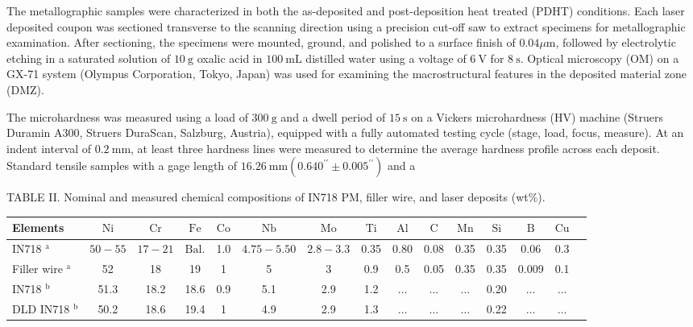 \documentclass[10pt]{article}
\begin{document}
The metallographic samples were characterized in both the as-deposited and post-deposition heat treated (PDHT) conditions. Each laser deposited coupon was sectioned transverse to the scanning direction using a precision cut-off saw to extract specimens for metallographic examination. After sectioning, the specimens were mounted, ground, and polished to a surface finish of $0.04 \mu \mathrm{m}$, followed by electrolytic etching in a saturated solution of $10 \mathrm{~g}$ oxalic acid in $100 \mathrm{~mL}$ distilled water using a voltage of $6 \mathrm{~V}$ for $8 \mathrm{~s}$. Optical microscopy (OM) on a GX-71 system (Olympus Corporation, Tokyo, Japan) was used for examining the macrostructural features in the deposited material zone (DMZ).

The microhardness was measured using a load of $300 \mathrm{~g}$ and a dwell period of $15 \mathrm{~s}$ on a Vickers microhardness (HV) machine (Struers Duramin A300, Struers DuraScan, Salzburg, Austria), equipped with a fully automated testing cycle (stage, load, focus, measure). At an indent interval of $0.2 \mathrm{~mm}$, at least three hardness lines were measured to determine the average hardness profile across each deposit. Standard tensile samples with a gage length of $16.26 \mathrm{~mm}\left(0.640^{\prime \prime} \pm 0.005^{\prime \prime}\right)$ and a

TABLE II. Nominal and measured chemical compositions of IN718 PM, filler wire, and laser deposits (wt\%).

\begin{center}
\begin{tabular}{lcccccccccccccc}
\hline\hline
Elements & $\mathrm{Ni}$ & $\mathrm{Cr}$ & $\mathrm{Fe}$ & $\mathrm{Co}$ & $\mathrm{Nb}$ & $\mathrm{Mo}$ & $\mathrm{Ti}$ & $\mathrm{Al}$ & $\mathrm{C}$ & $\mathrm{Mn}$ & $\mathrm{Si}$ & $\mathrm{B}$ & $\mathrm{Cu}$ \\
\hline
IN718 $^{\mathrm{a}}$ & $50-55$ & $17-21$ & $\mathrm{Bal}$. & 1.0 & $4.75-5.50$ & $2.8-3.3$ & 0.35 & 0.80 & 0.08 & 0.35 & 0.35 & 0.06 & 0.3 \\
Filler wire $^{\mathrm{a}}$ & 52 & 18 & 19 & 1 & 5 & 3 & 0.9 & 0.5 & 0.05 & 0.35 & 0.35 & 0.009 & 0.1 \\
IN718 $^{\mathrm{b}}$ & 51.3 & 18.2 & 18.6 & 0.9 & 5.1 & 2.9 & 1.2 & $\ldots$ & $\ldots$ & $\ldots$ & 0.20 & $\ldots$ & $\ldots$ \\
DLD IN718 $^{\mathrm{b}}$ & 50.2 & 18.6 & 19.4 & 1 & 4.9 & 2.9 & 1.3 & $\ldots$ & $\ldots$ & $\ldots$ & 0.22 & $\ldots$ & $\ldots$ \\
\hline\hline
\end{tabular}
\end{center}
\end{document}
